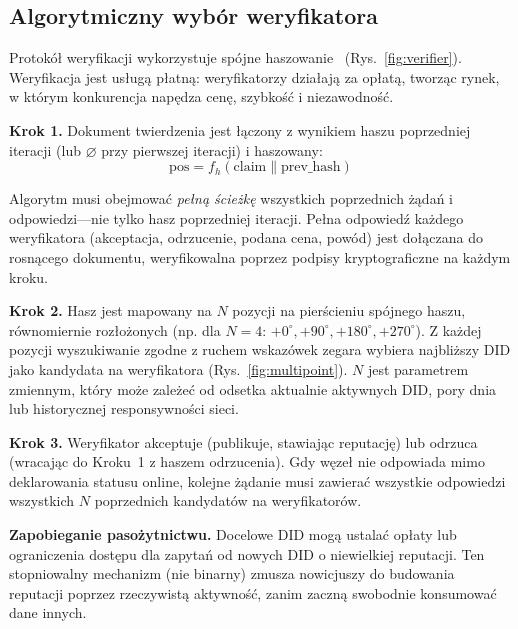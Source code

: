 \documentclass[11pt,a4paper,twocolumn]{article}
\begin{document}
\subsection{Algorytmiczny wybór weryfikatora}

Protokół weryfikacji wykorzystuje spójne haszowanie~\cite{karger1997} (Rys.~\ref{fig:verifier}). Weryfikacja jest usługą płatną: weryfikatorzy działają za opłatą, tworząc rynek, w którym konkurencja napędza cenę, szybkość i niezawodność.

\textbf{Krok 1.} Dokument twierdzenia jest łączony z wynikiem haszu poprzedniej iteracji (lub $\varnothing$ przy pierwszej iteracji) i haszowany:
\begin{equation}
\text{pos} = f_h(\text{claim} \| \text{prev\_hash})
\label{eq:hash}
\end{equation}

Algorytm musi obejmować \emph{pełną ścieżkę} wszystkich poprzednich żądań i odpowiedzi---nie tylko hasz poprzedniej iteracji. Pełna odpowiedź każdego weryfikatora (akceptacja, odrzucenie, podana cena, powód) jest dołączana do rosnącego dokumentu, weryfikowalna poprzez podpisy kryptograficzne na każdym kroku.

\textbf{Krok 2.} Hasz jest mapowany na $N$ pozycji na pierścieniu spójnego haszu, równomiernie rozłożonych (np. dla $N=4$: $+0^{\circ}, +90^{\circ}, +180^{\circ}, +270^{\circ}$). Z każdej pozycji wyszukiwanie zgodne z ruchem wskazówek zegara wybiera najbliższy DID jako kandydata na weryfikatora (Rys.~\ref{fig:multipoint}). $N$ jest parametrem zmiennym, który może zależeć od odsetka aktualnie aktywnych DID, pory dnia lub historycznej responsywności sieci.

\textbf{Krok 3.} Weryfikator akceptuje (publikuje, stawiając reputację) lub odrzuca (wracając do Kroku~1 z haszem odrzucenia). Gdy węzeł nie odpowiada mimo deklarowania statusu online, kolejne żądanie musi zawierać wszystkie odpowiedzi wszystkich $N$ poprzednich kandydatów na weryfikatorów.

\textbf{Zapobieganie pasożytnictwu.} Docelowe DID mogą ustalać opłaty lub ograniczenia dostępu dla zapytań od nowych DID o niewielkiej reputacji. Ten stopniowalny mechanizm (nie binarny) zmusza nowicjuszy do budowania reputacji poprzez rzeczywistą aktywność, zanim zaczną swobodnie konsumować dane innych.
\end{document}

